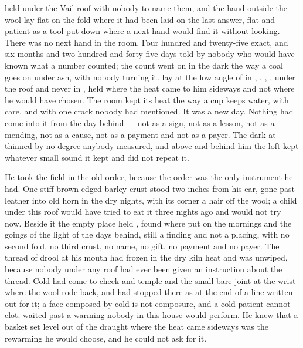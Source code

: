 
 held under the Vail roof with nobody to name them, and the hand outside the wool lay flat on the fold where it had been laid on the last answer, flat and patient as a tool put down where a next hand would find it without looking. There was no next hand in the room. Four hundred and twenty-five exact, and six months and two hundred and forty-five days told by nobody who would have known what a number counted; the count went on in the dark the way a coal goes on under ash, with nobody turning it.  lay at the low angle of  in , , , , under the roof and never in , held where the heat came to him sideways and not where he would have chosen. The room kept its heat the way a cup keeps water, with care, and with one crack nobody had mentioned. It was a new day. Nothing had come into it from the day behind --- not as a sign, not as a lesson, not as a mending, not as a cause, not as a payment and not as a payer. The dark at  thinned by no degree anybody measured, and above and behind him the loft kept whatever small sound it kept and did not repeat it.

He took the field in the old order, because the order was the only instrument he had. One stiff brown-edged barley crust stood two inches from his ear, gone past leather into old horn in the dry nights, with its corner a hair off the wool; a child under this roof would have tried to eat it three nights ago and would not try now. Beside it the empty place held , found where put on the mornings and the goings of the light of the days behind, still a finding and not a placing, with no second fold, no third crust, no name, no gift, no payment and no payer. The thread of drool at his mouth had frozen in the dry kiln heat and was unwiped, because nobody under any roof had ever been given an instruction about the thread. Cold had come to cheek and temple and the small bare joint at the wrist where the wool rode back, and had stopped there as at the end of a line written out for it; a face composed by cold is not composure, and a cold patient cannot clot.  waited past a warming nobody in this house would perform. He knew that a basket set level out of the draught where the heat came sideways was the rewarming he would choose, and he could not ask for it.

